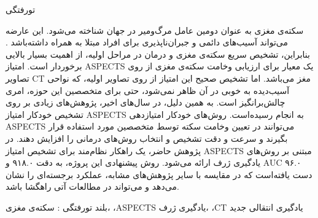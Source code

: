 


‌تورفتگی

سکته‌ی مغزی به عنوان دومین عامل مرگ‌و‌میر در جهان شناخته می‌شود.
این عارضه می‌تواند آسیب‌های دائمی و جبران‌ناپذیری برای افراد مبتلا به همراه داشته‌باشد \cite{donkor2018stroke}.
بنابراین،
تشخیص سریع سکته‌ی مغزی و درمان در مراحل اولیه، از اهمیت بسیار بالایی برخوردار است.
امتیاز ASPECTS یک معیار برای ارزیابی وخامت سکته‌ی مغزی از روی تصاویر CT مغز می‌باشد.
اما تشخیص صحیح این امتیاز از روی تصاویر اولیه، که نواحی آسیب‌دیده به خوبی در آن ظاهر نمی‌شود، حتی برای متخصصین این حوزه، امری چالش‌بر‌انگیز است.
به همین دلیل، در سال‌های اخیر، پژوهش‌های زیادی بر روی تشخیص خودکار امتیاز ASPECTS به انجام رسیده‌است.
روش‌های خودکار امتیاز‌دهی ASPECTS می‌توانند
 در تعیین وخامت سکته توسط متخصصین مورد استفاده قرار بگیرند و سرعت و دقت تشخیص و انتخاب روش‌های درمانی را افزایش دهند.
 در پژوهش حاضر، 
 یک راهکار نظام‌مند برای تشخیص امتیاز ASPECTS مبتنی بر روش‌های یادگیری ژرف ارائه می‌شود.
 روش پیشنهادی این پروژه،
 به دقت ۹۱۸.۰ و AUC ۹۶.۰ دست یافته‌است که
 در مقایسه با سایر پژوهش‌های مشابه، عملکرد برجسته‌ای را نشان می‌دهد و
می‌تواند در مطالعات آتی راهگشا باشد.

‌بلند
‌تورفتگی : 
سکته‌ی مغزی، ،ASPECTS یادگیری ژرف، ،CT یادگیری انتقالی
‌جدید
